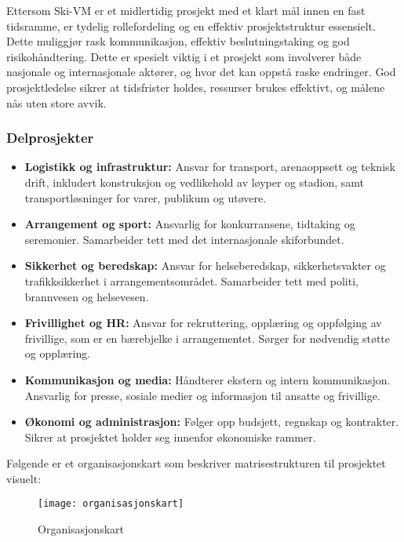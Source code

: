 Ettersom Ski-VM er et midlertidig prosjekt med et klart mål innen en fast tidsramme, er tydelig rollefordeling og en effektiv prosjektstruktur essensielt. Dette muliggjør rask kommunikasjon, effektiv beslutningstaking og god risikohåndtering. Dette er spesielt viktig i et prosjekt som involverer både nasjonale og internasjonale aktører, og hvor det kan oppstå raske endringer. God prosjektledelse sikrer at tidsfrister holdes, ressurser brukes effektivt, og målene nås uten store avvik.

\subsubsection*{Delprosjekter}

\begin{itemize}
    \item \textbf{Logistikk og infrastruktur:} Ansvar for transport, arenaoppsett og teknisk drift, inkludert konstruksjon og vedlikehold av løyper og stadion, samt transportløsninger for varer, publikum og utøvere.
    
    \item \textbf{Arrangement og sport:} Ansvarlig for konkurransene, tidtaking og seremonier. Samarbeider tett med det internasjonale skiforbundet.
    
    \item \textbf{Sikkerhet og beredskap:} Ansvar for helseberedskap, sikkerhetsvakter og trafikksikkerhet i arrangementsområdet. Samarbeider tett med politi, brannvesen og helsevesen.
    
    \item \textbf{Frivillighet og HR:} Ansvar for rekruttering, opplæring og oppfølging av frivillige, som er en bærebjelke i arrangementet. Sørger for nødvendig støtte og opplæring.
    
    \item \textbf{Kommunikasjon og media:} Håndterer ekstern og intern kommunikasjon. Ansvarlig for presse, sosiale medier og informasjon til ansatte og frivillige.
    
    \item \textbf{Økonomi og administrasjon:} Følger opp budsjett, regnskap og kontrakter. Sikrer at prosjektet holder seg innenfor økonomiske rammer.
    \end{itemize}
Følgende er et organisasjonskart som beskriver matrisestrukturen til prosjektet visuelt:
\begin{figure}[H]
    \centering
    \texttt{[image: organisasjonskart]}
    \caption{Organisasjonskart}
    \label{fig:organisasjonskart}
\end{figure}